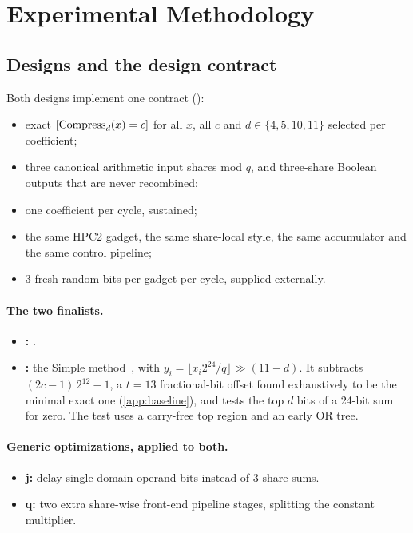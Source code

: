 \section{Experimental Methodology}\label{sec:method}

\subsection{Designs and the design contract}
Both designs implement one contract ():
\begin{itemize}
  \item exact $[\operatorname{Compress}_d(x) = c]$ for all $x$, all $c$ and $d \in \{4,5,10,11\}$ selected per coefficient;
  \item three canonical arithmetic input shares mod $q$, and three-share Boolean outputs that are never recombined;
  \item one coefficient per cycle, sustained;
  \item the same HPC2 gadget, the same share-local style, the same accumulator and the same control pipeline;
  \item 3 fresh random bits per gadget per cycle, supplied externally.
\end{itemize}

\paragraph{The two finalists.}
\begin{itemize}
  \item \textbf{:} \PAMS{}.
  \item \textbf{:} the Simple method~\cite{fritzmann2022,danvers2023}, with $y_i = \lfloor x_i 2^{24}/q \rfloor \gg (11 - d)$. It subtracts $(2c - 1)\,2^{12} - 1$, a $t = 13$ fractional-bit offset found exhaustively to be the minimal exact one (\cref{app:baseline}), and tests the top $d$ bits of a 24-bit sum for zero. The test uses a carry-free top region and an early OR tree.
\end{itemize}

\paragraph{Generic optimizations, applied to both.}
\begin{itemize}
  \item \textbf{j:} delay single-domain operand bits instead of 3-share sums.
  \item \textbf{q:} two extra share-wise front-end pipeline stages, splitting the constant multiplier.
\end{itemize}

